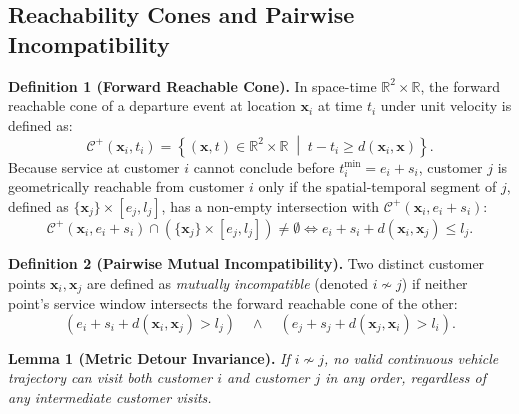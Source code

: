 \subsection{Reachability Cones and Pairwise Incompatibility}
\label{sec:reachability}

\noindent\textbf{Definition 1 (Forward Reachable Cone).}
In space-time $\mathbb{R}^2 \times \mathbb{R}$, the forward reachable cone of a departure event at location $\mathbf{x}_i$ at time $t_i$ under unit velocity is defined as:
\begin{equation}
\mathcal{C}^+(\mathbf{x}_i, t_i) = \left\{ (\mathbf{x}, t) \in \mathbb{R}^2 \times \mathbb{R} \;\middle|\; t - t_i \ge d(\mathbf{x}_i, \mathbf{x}) \right\}.
\end{equation}
Because service at customer $i$ cannot conclude before $t_i^{\min} = e_i + s_i$, customer $j$ is geometrically reachable from customer $i$ only if the spatial-temporal segment of $j$, defined as $\{\mathbf{x}_j\} \times [e_j, l_j]$, has a non-empty intersection with $\mathcal{C}^+(\mathbf{x}_i, e_i + s_i)$:
\begin{equation}
\mathcal{C}^+(\mathbf{x}_i, e_i + s_i) \cap \left( \{\mathbf{x}_j\} \times [e_j, l_j] \right) \neq \emptyset \iff e_i + s_i + d(\mathbf{x}_i, \mathbf{x}_j) \le l_j.
\end{equation}

\noindent\textbf{Definition 2 (Pairwise Mutual Incompatibility).}
Two distinct customer points $\mathbf{x}_i, \mathbf{x}_j$ are defined as \textit{mutually incompatible} (denoted $i \nsim j$) if neither point's service window intersects the forward reachable cone of the other:
\begin{equation}
(e_i + s_i + d(\mathbf{x}_i, \mathbf{x}_j) > l_j) \quad \land \quad (e_j + s_j + d(\mathbf{x}_j, \mathbf{x}_i) > l_i).
\end{equation}

\vspace{0.25cm}
\noindent\textbf{Lemma 1 (Metric Detour Invariance).}
\textit{If $i \nsim j$, no valid continuous vehicle trajectory can visit both customer $i$ and customer $j$ in any order, regardless of any intermediate customer visits.}

